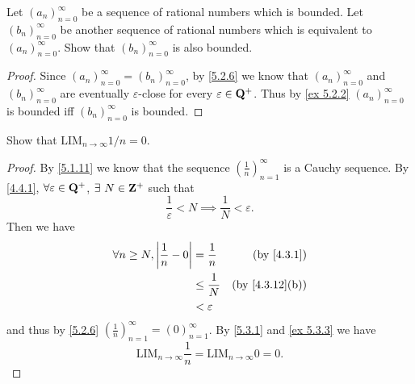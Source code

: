 \begin{exercise}\label{ex 5.3.4}
  Let \((a_n)_{n = 0}^{\infty}\) be a sequence of rational numbers which is bounded.
  Let \((b_n)_{n = 0}^{\infty}\) be another sequence of rational numbers which is equivalent to \((a_n)_{n = 0}^{\infty}\).
  Show that \((b_n)_{n = 0}^{\infty}\) is also bounded.
\end{exercise}

\begin{proof}
  Since \((a_n)_{n = 0}^{\infty} = (b_n)_{n = 0}^{\infty}\), by \cref{5.2.6} we know that \((a_n)_{n = 0}^{\infty}\) and \((b_n)_{n = 0}^{\infty}\) are eventually \(\varepsilon\)-close for every \(\varepsilon \in \mathbf{Q}^+\).
  Thus by \cref{ex 5.2.2} \((a_n)_{n = 0}^{\infty}\) is bounded iff \((b_n)_{n = 0}^{\infty}\) is bounded.
\end{proof}

\begin{exercise}\label{ex 5.3.5}
  Show that \(\text{LIM}_{n \to \infty} 1 / n = 0\).
\end{exercise}

\begin{proof}
  By \cref{5.1.11} we know that the sequence \((\frac{1}{n})_{n = 1}^{\infty}\) is a Cauchy sequence.
  By \cref{4.4.1}, \(\forall \varepsilon \in \mathbf{Q}^+\), \(\exists\ N \in \mathbf{Z}^+\) such that
  \[
    \frac{1}{\varepsilon} < N \implies \frac{1}{N} < \varepsilon.
  \]
  Then we have
  \begin{align*}
    \forall n \geq N, \abs{\frac{1}{n} - 0} & = \frac{1}{n}    & \text{(by \cref{4.3.1})}     \\
                                            & \leq \frac{1}{N} & \text{(by \cref{4.3.12}(b))} \\
                                            & < \varepsilon
  \end{align*}
  and thus by \cref{5.2.6} \((\frac{1}{n})_{n = 1}^\infty = (0)_{n = 1}^\infty\).
  By \cref{5.3.1} and \cref{ex 5.3.3} we have
  \[
    \text{LIM}_{n \to \infty} \frac{1}{n} = \text{LIM}_{n \to \infty} 0 = 0.
  \]
\end{proof}